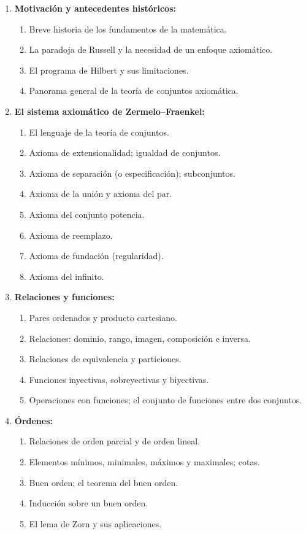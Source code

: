 \begin{refsection}
\begin{enumerate}
\item \textbf{Motivación y antecedentes históricos:}
\begin{enumerate}
    \item Breve historia de los fundamentos de la matemática.
    \item La paradoja de Russell y la necesidad de un enfoque axiomático.
    \item El programa de Hilbert y sus limitaciones.
    \item Panorama general de la teoría de conjuntos axiomática.
\end{enumerate}

\item \textbf{El sistema axiomático de Zermelo--Fraenkel:}
\begin{enumerate}
    \item El lenguaje de la teoría de conjuntos.
    \item Axioma de extensionalidad; igualdad de conjuntos.
    \item Axioma de separación (o especificación); subconjuntos.
    \item Axioma de la unión y axioma del par.
    \item Axioma del conjunto potencia.
    \item Axioma de reemplazo.
    \item Axioma de fundación (regularidad).
    \item Axioma del infinito.
\end{enumerate}

\item \textbf{Relaciones y funciones:}
\begin{enumerate}
    \item Pares ordenados y producto cartesiano.
    \item Relaciones: dominio, rango, imagen, composición e inversa.
    \item Relaciones de equivalencia y particiones.
    \item Funciones inyectivas, sobreyectivas y biyectivas.
    \item Operaciones con funciones; el conjunto de funciones entre dos conjuntos.
\end{enumerate}

\item \textbf{Órdenes:}
\begin{enumerate}
    \item Relaciones de orden parcial y de orden lineal.
    \item Elementos mínimos, minimales, máximos y maximales; cotas.
    \item Buen orden; el teorema del buen orden.
    \item Inducción sobre un buen orden.
    \item El lema de Zorn y sus aplicaciones.
\end{enumerate}


\end{enumerate}
\end{refsection}
